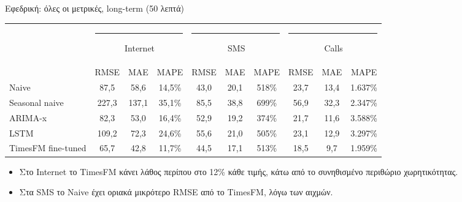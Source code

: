 \documentclass[aspectratio=169,10pt]{beamer}
\newcommand{\muted}[1]{\textcolor{muted}{#1}}
\newcommand{\ser}[2]{\textcolor{#1}{\rule[0.05em]{0.6em}{0.6em}}\,#2}
\newcommand{\sInet}{\ser{inet}{Internet}}
\newcommand{\sSms}{\ser{sms}{SMS}}
\newcommand{\sCalls}{\ser{calls}{Calls}}
\begin{document}
\begin{frame}{Εφεδρική: όλες οι μετρικές, long-term (50 λεπτά)}
  \centering
  \footnotesize\setlength{\tabcolsep}{4.5pt}
  \begin{tabular}{@{}lccccccccc@{}}
    \toprule
    & \multicolumn{3}{c}{\sInet} & \multicolumn{3}{c}{\sSms} & \multicolumn{3}{c}{\sCalls} \\
    \cmidrule(lr){2-4}\cmidrule(lr){5-7}\cmidrule(l){8-10}
    & RMSE & MAE & MAPE & RMSE & MAE & MAPE & RMSE & MAE & MAPE \\
    \midrule
    Naive              & 87,5 & 58,6 & 14,5\% & 43,0 & 20,1 & \muted{518\%} & 23,7 & 13,4 & \muted{1.637\%} \\
    Seasonal naive     & 227,3 & 137,1 & 35,1\% & 85,5 & 38,8 & \muted{699\%} & 56,9 & 32,3 & \muted{2.347\%} \\
    ARIMA-x            & 82,3 & 53,0 & 16,4\% & 52,9 & 19,2 & \muted{374\%} & 21,7 & 11,6 & \muted{3.588\%} \\
    LSTM               & 109,2 & 72,3 & 24,6\% & 55,6 & 21,0 & \muted{505\%} & 23,1 & 12,9 & \muted{3.297\%} \\
    TimesFM fine-tuned & \alert{65,7} & \alert{42,8} & \alert{11,7\%} & 44,5 & \alert{17,1} & \muted{513\%} & \alert{18,5} & \alert{9,7} & \muted{1.959\%} \\
    \bottomrule
  \end{tabular}

  \vspace{0.8em}
  \raggedright\small
  \begin{itemize}
    \item Στο Internet το TimesFM κάνει λάθος περίπου στο \alert{12\%} κάθε τιμής, κάτω από το συνηθισμένο περιθώριο χωρητικότητας.
    \item Στα SMS το Naive έχει οριακά μικρότερο RMSE από το TimesFM, λόγω των αιχμών.
  \end{itemize}
\end{frame}
\end{document}
